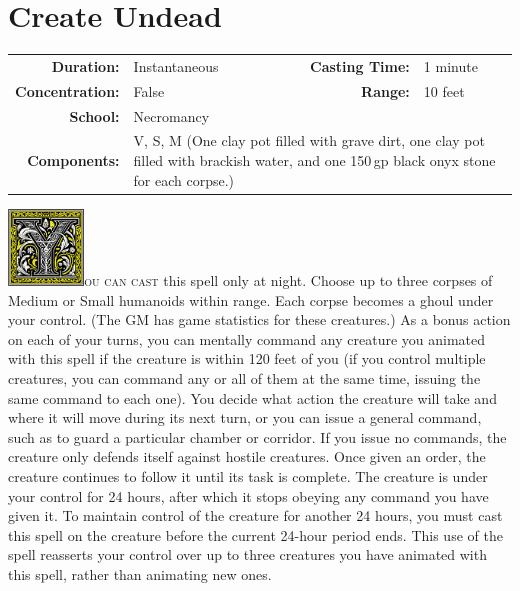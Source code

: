 \documentclass[12pt,showtrims]{memoir}
\begin{document}
\newpage
\section*{Create Undead}

{
\small\centering\vspace{-6pt}
\begin{tabular}{rlrl}
\toprule

\textbf{Duration:} & Instantaneous &
\textbf{Casting Time:} & 1 minute \\
\textbf{Concentration:} & False &
\textbf{Range:} & 10 feet \\
\textbf{School:} & Necromancy \\
\textbf{Components:} & \multicolumn{3}{p{0.7\textwidth}}{V, S, M (One clay pot filled with grave dirt, one clay pot filled with brackish water, and one 150\,gp black onyx stone for each corpse.)}\\

\bottomrule
\end{tabular}
}

\vspace{1\baselineskip}\noindent
\lettrine[lines=4]{\includegraphics[height=58pt]{initials/Y.png}}{ou can cast} this spell only at night. Choose up to three corpses of Medium or Small humanoids within range. Each corpse becomes a ghoul under your control. (The GM has game statistics for these creatures.) As a bonus action on each of your turns, you can mentally command any creature you animated with this spell if the creature is within 120 feet of you (if you control multiple creatures, you can command any or all of them at the same time, issuing the same command to each one). You decide what action the creature will take and where it will move during its next turn, or you can issue a general command, such as to guard a particular chamber or corridor. If you issue no commands, the creature only defends itself against hostile creatures. Once given an order, the creature continues to follow it until its task is complete. The creature is under your control for 24 hours, after which it stops obeying any command you have given it. To maintain control of the creature for another 24 hours, you must cast this spell on the creature before the current 24-hour period ends. This use of the spell reasserts your control over up to three creatures you have animated with this spell, rather than animating new ones.
\end{document}
